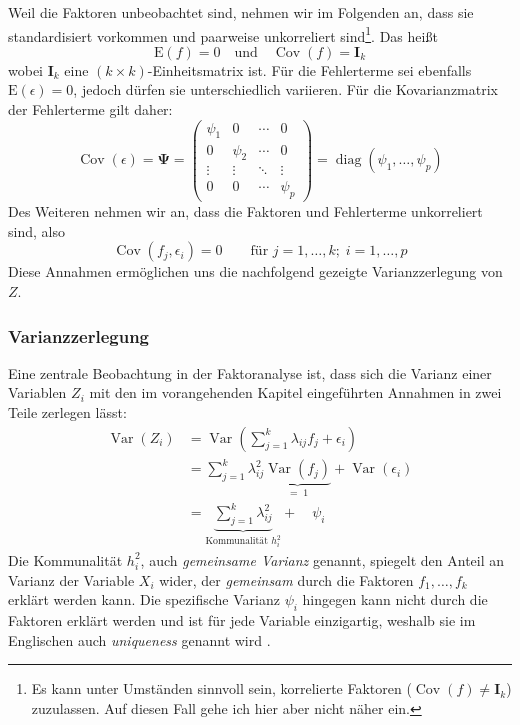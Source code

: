 \documentclass[11pt]{scrartcl}
\DeclareMathOperator{\diag}{diag}
\DeclareMathOperator{\Cov}{Cov}
\DeclareMathOperator{\Var}{Var}
\begin{document}
	Weil die Faktoren unbeobachtet sind, nehmen wir im Folgenden an, dass sie
	standardisiert vorkommen und paarweise unkorreliert sind\footnote{Es kann unter Umständen
		sinnvoll sein, korrelierte Faktoren ($\Cov(f) \neq \mathbf{I}_k$) zuzulassen. Auf diesen Fall gehe ich hier aber nicht näher ein.}. Das heißt 
	\begin{equation}
		\label{Verteilung von f}
		\text{E}(f) = 0 \quad \text{und} \quad \Cov(f) = \mathbf{I}_{k}
	\end{equation}
    wobei $\mathbf{I}_k$ eine $(k \times k)$-Einheitsmatrix ist.
	Für die Fehlerterme sei ebenfalls $\text{E}(\epsilon) = 0$, jedoch dürfen sie
	unterschiedlich variieren. Für die Kovarianzmatrix der Fehlerterme gilt daher:
	\begin{equation} \label{Psi}
		\Cov(\epsilon) =
		\mathbf{\Psi} =
		\begin{pmatrix}
			\psi_1 & 0 & \cdots & 0 \\
			0 & \psi_2 &\cdots & 0 \\
			\vdots  & \vdots  & \ddots & \vdots  \\
			0 & 0 & \cdots & \psi_p 
		\end{pmatrix} = \diag \left(\psi_1,\dotsc, \psi_p\right)
	\end{equation}
	Des Weiteren nehmen wir an, dass die Faktoren und Fehlerterme unkorreliert sind, also
	\begin{equation} \label{Unkorrelierte Faktoren und Fehlerterme}
		\Cov(f_j, \epsilon_i) = 0 \qquad \text{für } j = 1, \dotsc, k; \; i = 1,\dotsc,p
	\end{equation}
	Diese Annahmen ermöglichen uns die nachfolgend gezeigte Varianzzerlegung
	von $Z$.
	\subsubsection{Varianzzerlegung}
	\label{Varianzzerlegung}
	Eine zentrale Beobachtung in der Faktoranalyse ist, dass sich die Varianz einer Variablen $Z_i$
	mit den im vorangehenden Kapitel eingeführten Annahmen in zwei Teile zerlegen lässt:
	\begin{equation}
		\begin{split}
			\Var\left(Z_i\right) &= \Var\left(\sum_{j=1}^k \lambda_{ij}f_j +
			\epsilon_i\right) \\
			&= \sum_{j=1}^k \lambda_{ij}^2 \underbrace{\Var(f_j)}_{=\; 1} +
			\Var(\epsilon_i) \\
			&= \underbrace{\sum_{j=1}^k \lambda_{ij}^2}_\text{Kommunalität $h_i^2$} + \quad \psi_i
		\end{split}
	\end{equation}
	Die Kommunalität $h_i^2$, auch \textit{gemeinsame Varianz} genannt, spiegelt
	den Anteil an Varianz der Variable $X_i$ wider, der \textit{gemeinsam} durch die Faktoren $f_1,\dotsc,f_k$
	erklärt werden kann. Die spezifische Varianz $\psi_i$ hingegen kann nicht
	durch die Faktoren erklärt werden und ist für jede Variable einzigartig, weshalb
	sie im Englischen auch \textit{uniqueness} genannt wird \parencite[441]{Backhaus.2021}.
	
\end{document}
